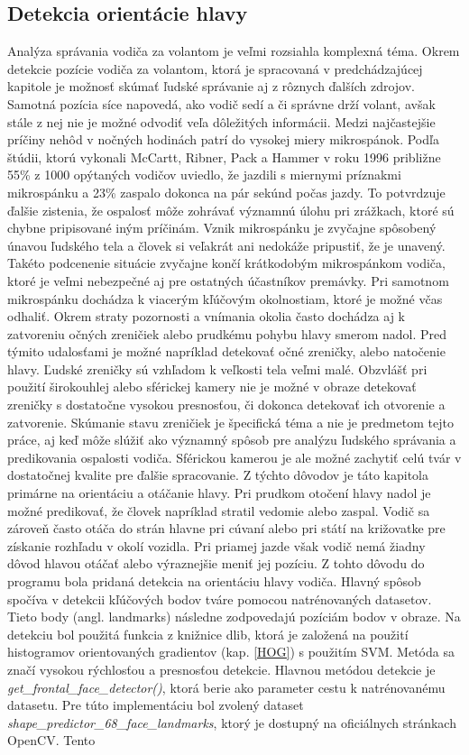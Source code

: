 \documentclass[slovak,master,dept460,male,cpp,cpdeclaration]{diploma}
\begin{document}
\subsection{Detekcia orientácie hlavy}
\label{sec:headOrientation}
Analýza správania vodiča za volantom je  veľmi rozsiahla komplexná téma. Okrem detekcie pozície vodiča za volantom, ktorá je spracovaná v predchádzajúcej kapitole je možnosť skúmať ľudské správanie aj z rôznych ďalších zdrojov. Samotná pozícia  síce napovedá, ako vodič sedí a či správne drží volant, avšak  stále z nej nie je možné odvodiť veľa dôležitých informácii.  Medzi najčastejšie príčiny nehôd v nočných hodinách patrí do vysokej miery mikrospánok. Podľa štúdii\cite{mccartt1996scope}, ktorú vykonali McCartt, Ribner, Pack a Hammer  v roku 1996 približne 55\% z 1000 opýtaných vodičov uviedlo, že jazdili s miernymi príznakmi mikrospánku a 23\% zaspalo dokonca na pár sekúnd počas jazdy. To potvrdzuje ďalšie zistenia, že ospalosť môže zohrávať významnú úlohu pri zrážkach, ktoré sú chybne pripisované iným príčinám. Vznik mikrospánku je zvyčajne spôsobený únavou ľudského tela  a človek si veľakrát ani nedokáže pripustiť, že je unavený. Takéto podcenenie situácie zvyčajne končí krátkodobým mikrospánkom  vodiča, ktoré je  veľmi nebezpečné aj pre ostatných účastníkov premávky.  Pri samotnom mikrospánku dochádza  k viacerým kľúčovým okolnostiam, ktoré je možné včas odhaliť. Okrem straty pozornosti a vnímania okolia často dochádza aj k zatvoreniu očných zreničiek alebo prudkému pohybu hlavy smerom nadol. Pred týmito udalosťami je možné napríklad detekovať  očné zreničky, alebo natočenie hlavy. Ľudské zreničky sú vzhľadom  k veľkosti tela veľmi malé. Obzvlášť pri použití širokouhlej alebo sférickej kamery nie je možné v obraze detekovať  zreničky s dostatočne vysokou presnosťou, či dokonca detekovať ich otvorenie a zatvorenie.  Skúmanie stavu zreničiek je špecifická téma a nie je predmetom tejto práce, aj keď môže slúžiť ako významný spôsob pre analýzu ľudského správania  a predikovania ospalosti vodiča. Sférickou kamerou je ale možné  zachytiť celú tvár v dostatočnej kvalite pre ďalšie spracovanie. Z týchto dôvodov je  táto kapitola  primárne na orientáciu a otáčanie hlavy. Pri prudkom otočení hlavy nadol je možné predikovať, že človek napríklad stratil vedomie alebo zaspal. Vodič sa zároveň často otáča do strán  hlavne pri cúvaní alebo pri  státí na križovatke pre získanie rozhľadu v okolí vozidla.  Pri priamej jazde však vodič nemá žiadny dôvod hlavou otáčať alebo výraznejšie meniť jej pozíciu. Z tohto dôvodu  do programu  bola pridaná detekcia na orientáciu hlavy vodiča. Hlavný spôsob spočíva v detekcii  kľúčových bodov tváre pomocou natrénovaných datasetov.  Tieto body (angl. landmarks) následne zodpovedajú pozíciám bodov v obraze. Na detekciu bol použitá funkcia z knižnice dlib, ktorá je založená na použití histogramov orientovaných gradientov (kap. \ref{HOG}) s použitím SVM. Metóda sa značí vysokou rýchlosťou a presnosťou detekcie.  Hlavnou metódou detekcie je \textit{get\_frontal\_face\_detector()}, ktorá berie ako parameter cestu k natrénovanému datasetu. Pre túto implementáciu bol zvolený dataset \textit{shape\_predictor\_68\_face\_landmarks}, ktorý je dostupný na oficiálnych stránkach OpenCV. Tento 
\end{document}
